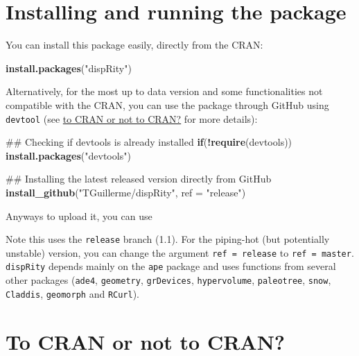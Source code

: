 \documentclass[]{book}
\newenvironment{Shaded}{\begin{snugshade}}{\end{snugshade}}
\newcommand{\KeywordTok}[1]{\textcolor[rgb]{0.13,0.29,0.53}{\textbf{#1}}}
\newcommand{\DataTypeTok}[1]{\textcolor[rgb]{0.13,0.29,0.53}{#1}}
\newcommand{\StringTok}[1]{\textcolor[rgb]{0.31,0.60,0.02}{#1}}
\newcommand{\ControlFlowTok}[1]{\textcolor[rgb]{0.13,0.29,0.53}{\textbf{#1}}}
\newcommand{\OperatorTok}[1]{\textcolor[rgb]{0.81,0.36,0.00}{\textbf{#1}}}
\newcommand{\NormalTok}[1]{#1}
\theoremstyle{definition}
\theoremstyle{definition}
\theoremstyle{remark}
\begin{document}
\section{Installing and running the
package}\label{installing-and-running-the-package}

You can install this package easily, directly from the CRAN:

\begin{Shaded}
\begin{Highlighting}[]
\KeywordTok{install.packages}\NormalTok{(}\StringTok{"dispRity"}\NormalTok{)}
\end{Highlighting}
\end{Shaded}

Alternatively, for the most up to data version and some functionalities
not compatible with the CRAN, you can use the package through GitHub
using \texttt{devtool} (see \protect\hyperlink{noCRAN}{to CRAN or not to
CRAN?} for more details):

\begin{Shaded}
\begin{Highlighting}[]
\NormalTok{## Checking if devtools is already installed}
\ControlFlowTok{if}\NormalTok{(}\OperatorTok{!}\KeywordTok{require}\NormalTok{(devtools)) }\KeywordTok{install.packages}\NormalTok{(}\StringTok{"devtools"}\NormalTok{)}

\NormalTok{## Installing the latest released version directly from GitHub}
\KeywordTok{install_github}\NormalTok{(}\StringTok{"TGuillerme/dispRity"}\NormalTok{, }\DataTypeTok{ref =} \StringTok{"release"}\NormalTok{)}
\end{Highlighting}
\end{Shaded}

Anyways to upload it, you can use

Note this uses the \texttt{release} branch (1.1). For the piping-hot
(but potentially unstable) version, you can change the argument
\texttt{ref\ =\ release} to \texttt{ref\ =\ master}. \texttt{dispRity}
depends mainly on the \texttt{ape} package and uses functions from
several other packages (\texttt{ade4}, \texttt{geometry},
\texttt{grDevices}, \texttt{hypervolume}, \texttt{paleotree},
\texttt{snow}, \texttt{Claddis}, \texttt{geomorph} and \texttt{RCurl}).

\hypertarget{noCRAN}{\section{To CRAN or not to CRAN?}\label{noCRAN}}
\end{document}
